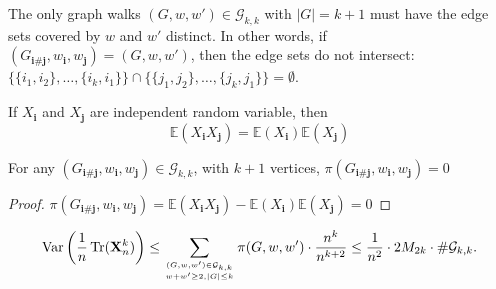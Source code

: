 \begin{lemma}
    \label{lem:disjoint_edge_set}
    \notready
    The only graph walks $(G,w,w')\in \mathcal{G}_{k,k}$ with $|G|=k+1$ must have the edge sets covered by $w$ and $w'$ distinct.  
    In other words, if $(G_{\mathbf{i}\#\mathbf{j}},w_\mathbf{i},w_\mathbf{j}) = (G,w,w')$, then the edge sets do not intersect: 
    $\{\{i_1,i_2\},\ldots,\{i_k,i_1\}\}\cap\{\{j_1,j_2\},\ldots,\{j_k,j_1\}\}=\emptyset$. 
\end{lemma}



\begin{lemma}
   \label{lem:independent_expectation}
   \notready
   If $X_{\mathbf{i}}$ and $X_{\mathbf{j}}$ are independent random variable, then $$\mathbb{E}(X_{\mathbf{i}}X_{\mathbf{j}}) = \mathbb{E}(X_{\mathbf{i}})\mathbb{E}(X_{\mathbf{j}}) $$

\end{lemma}


\begin{lemma}
    \label{lem:G_leq_k}
    \notready
    For any $(G_{\mathbf{i}\#\mathbf{j}},w_\mathbf{i},w_\mathbf{j}) \in \mathcal{G}_{k,k}$, with $k + 1$ vertices, $\pi(G_{\mathbf{i}\#\mathbf{j}},w_\mathbf{i},w_\mathbf{j})  = 0$ 
    \begin{proof}
     $\pi(G_{\mathbf{i}\#\mathbf{j}},w_\mathbf{i},w_\mathbf{j}) = \mathbb{E}(X_{\mathbf{i}}X_{\mathbf{j}}) - \mathbb{E}(X_{\mathbf{i}})\mathbb{E}(X_{\mathbf{j}})  = 0$
    \end{proof}
\end{lemma}


\begin{lemma}
    \label{lem:elimination_kp1}
    \notready

    \[ \operatorname{Var}\left( \frac1n\operatorname{Tr}(\mathbf{X}_n^k)\right) \le \sum_{(G,w,w')\in\mathcal{G}_{k,k}\atop w+w'\ge 2, |G| \leq k} \pi(G,w,w')\cdot \frac{n^{k}}{n^{k+2}} \le \frac{1}{n^2}\cdot 2M_{2k}\cdot \#\mathcal{G}_{k,k}. \]
\end{lemma}




